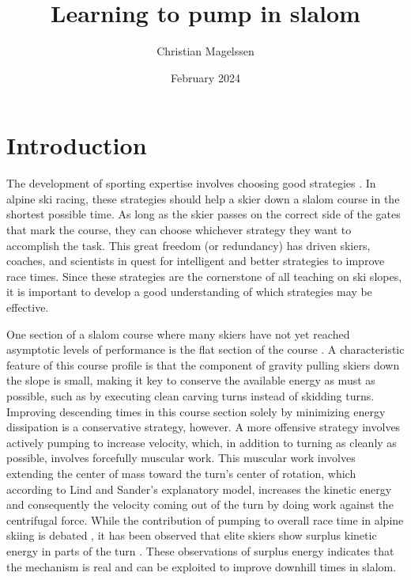 \documentclass{article}
\title{Learning to pump in slalom}
\author{Christian Magelssen}
\date{February 2024}
\begin{document}
\section{Introduction}

The development of sporting expertise involves choosing good strategies \cite{krakauer_motor_2019, taylor_role_2012, gray_plateaus_2017, taylor_cerebellar_2014}. In alpine ski racing, these strategies should help a skier down a slalom course in the shortest possible time. As long as the skier passes on the correct side of the gates that mark the course, they can choose whichever strategy they want to accomplish the task. This great freedom (or redundancy) has driven skiers, coaches, and scientists in quest for intelligent and better strategies to improve race times\cite{lemaster_skiers_1999, lemaster_ultimate_2010, reid_kinematic_2010, joubert_how_1967, joubert_ski_1978, luginbuhl_identification_2023, lind_physics_2013}. Since these strategies are the cornerstone of all teaching on ski slopes, it is important to develop a good understanding of which strategies may be effective.

One section of a slalom course where many skiers have not yet reached asymptotic levels of performance is the flat section of the course \cite{supej_new_2011, magelssen_is_2022}. A characteristic feature of this course profile is that the component of gravity pulling skiers down the slope is small, making it key to conserve the available energy as must as possible, such as by executing clean carving turns instead of skidding turns\cite{supej_how_2010}. Improving descending times in this course section solely by minimizing energy dissipation is a conservative strategy, however. A more offensive strategy involves actively pumping to increase velocity\cite{lind_physics_2013}, which, in addition to turning as cleanly as possible, involves forcefully muscular work. This muscular work involves extending the center of mass toward the turn's center of rotation, which according to Lind and Sander's\cite{lind_physics_2013} explanatory model, increases the kinetic energy and consequently the velocity coming out of the turn by doing work against the centrifugal force. While the contribution of pumping to overall race time in alpine skiing is debated \cite{supej_differential_2008}, it has been observed that elite skiers show surplus kinetic energy in parts of the turn \cite{reid_kinematic_2010, supej_differential_2008, supej_how_2010}. These observations of surplus energy indicates that the mechanism is real and can be exploited to improve downhill times in slalom.
\end{document}
